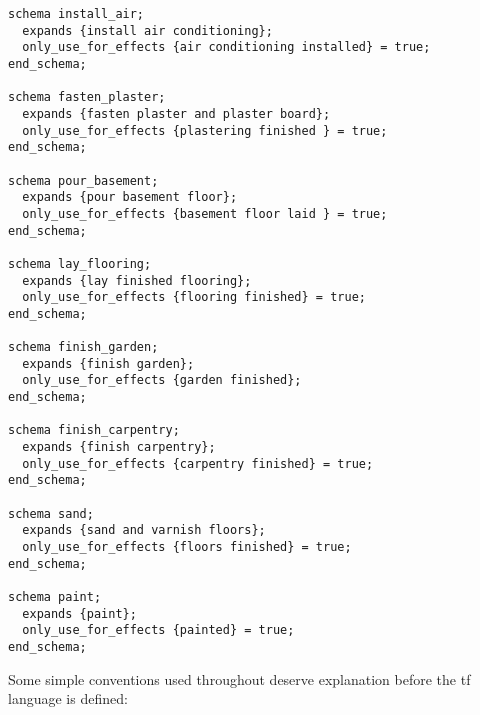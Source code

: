 \begin{verbatim}
schema install_air;
  expands {install air conditioning};
  only_use_for_effects {air conditioning installed} = true;
end_schema;

schema fasten_plaster;
  expands {fasten plaster and plaster board};
  only_use_for_effects {plastering finished } = true;
end_schema;

schema pour_basement;
  expands {pour basement floor};
  only_use_for_effects {basement floor laid } = true;
end_schema;

schema lay_flooring;
  expands {lay finished flooring};
  only_use_for_effects {flooring finished} = true;
end_schema;

schema finish_garden;
  expands {finish garden};
  only_use_for_effects {garden finished};
end_schema;

schema finish_carpentry;
  expands {finish carpentry};
  only_use_for_effects {carpentry finished} = true;
end_schema;

schema sand;
  expands {sand and varnish floors};
  only_use_for_effects {floors finished} = true;
end_schema;

schema paint;
  expands {paint};
  only_use_for_effects {painted} = true;
end_schema;
\end{verbatim}


Some simple conventions used throughout deserve explanation before the
{\sc tf} language is defined:

